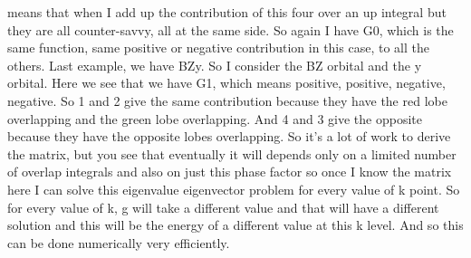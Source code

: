 means that when I add up the contribution of this four over an up integral but they are all counter-savvy, all at the same side. So again I have G0, which is the same function, same positive or negative contribution in this case, to all the others. Last example, we have BZy. So I consider the BZ orbital and the y orbital. Here we see that we have G1, which means positive, positive, negative, negative. So 1 and 2 give the same contribution because they have the red lobe overlapping and the green lobe overlapping. And 4 and 3 give the opposite because they have the opposite lobes overlapping. So it's a lot of work to derive the matrix, but you see that eventually it will depends only on a limited number of overlap integrals and also on just this phase factor so once I know the matrix here I can solve this eigenvalue eigenvector problem for every value of k point. So for every value of k, g will take a different value and that will have a different solution and this will be the energy of a different value at this k level. And so this can be done numerically very efficiently.
